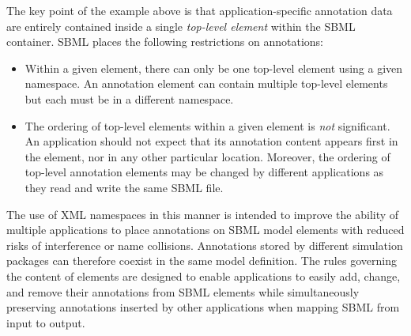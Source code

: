 The key point of the example above is that application-specific
annotation data are entirely contained inside a single
\emph{top-level element} within the SBML 
container.  SBML \thisLVnum places the following
restrictions on annotations:
\begin{itemize}

\item Within a given  element, there can
  only be one top-level element using a given namespace.  An
  annotation element can contain multiple top-level elements but
  each must be in a different namespace.

  
\item The ordering of top-level elements within a given
   element is \emph{not} significant.  An
  application should not expect that its annotation content
  appears first in the  element, nor in any
  other particular location.  Moreover, the ordering of
    top-level annotation elements may be changed by
  different applications as they read and write the same
    SBML file.

\end{itemize}

The use of XML namespaces in this manner is intended to improve
the ability of multiple applications to place annotations on SBML
model elements with reduced risks of interference or name
collisions.  Annotations stored by different simulation packages
can therefore coexist in the same model definition.  The rules
governing the content of  elements are designed
to enable applications to easily add, change, and remove their
annotations from SBML elements while simultaneously preserving
annotations inserted by other applications when mapping SBML from
input to output.

